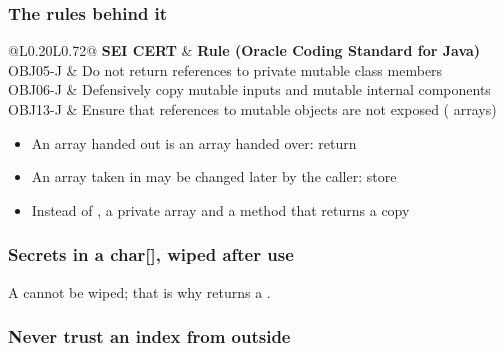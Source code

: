 \documentclass[aspectratio=169,10pt,compress]{beamer}
\begin{document}
\begin{frame}[t,fragile] \frametitle{The rules behind it}


\begin{table}
		\footnotesize
		\begin{tabular}{@{}L{0.20\textwidth}L{0.72\textwidth}@{}}
			\toprule
			\textbf{SEI CERT} & \textbf{Rule (Oracle Coding Standard for Java)} \\
			\midrule
			OBJ05-J & Do not return references to private mutable class members \\
			OBJ06-J & Defensively copy mutable inputs and mutable internal components \\
			OBJ13-J & Ensure that references to mutable objects are not exposed ( arrays) \\
			\bottomrule
		\end{tabular}
\end{table}%


	\begin{itemize}\small
		\item An array handed out is an array handed over: return 
		\item An array taken in may be changed later by the caller: store 
		\item Instead of , a private array and a method that returns a copy
	\end{itemize}


\end{frame}




\begin{frame}[t,fragile] \frametitle{Secrets in a char[], wiped after use}

	\footnotesize A  cannot be wiped; that is why  returns a .
\end{frame}




\begin{frame}[t,fragile] \frametitle{Never trust an index from outside}

	\footnotesize {}
\end{frame}
\end{document}
